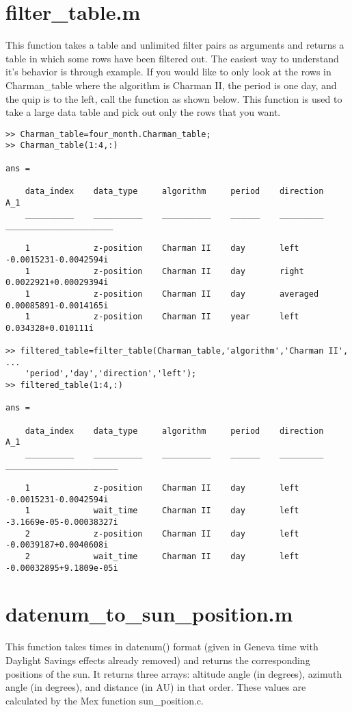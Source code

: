 \documentclass[12pt]{report}
\begin{document}
\section{filter\_table.m}
This function takes a table and unlimited filter pairs as arguments and returns a table in which some rows have been filtered out.  The easiest way to understand it's behavior is through example.  If you would like to only look at the rows in Charman\_table where the algorithm is Charman II, the period is one day, and the quip is to the left, call the function as shown below.  This function is used to take a large data table and pick out only the rows that you want.

\begin{verbatim}
>> Charman_table=four_month.Charman_table;
>> Charman_table(1:4,:)

ans = 

    data_index    data_type     algorithm     period    direction             A_1          
    __________    __________    __________    ______    _________    ______________________

    1             z-position    Charman II    day       left         -0.0015231-0.0042594i 
    1             z-position    Charman II    day       right         0.0022921+0.00029394i
    1             z-position    Charman II    day       averaged     0.00085891-0.0014165i 
    1             z-position    Charman II    year      left           0.034328+0.010111i  

>> filtered_table=filter_table(Charman_table,'algorithm','Charman II', ...
    'period','day','direction','left');
>> filtered_table(1:4,:)

ans = 

    data_index    data_type     algorithm     period    direction              A_1          
    __________    __________    __________    ______    _________    _______________________

    1             z-position    Charman II    day       left          -0.0015231-0.0042594i 
    1             wait_time     Charman II    day       left         -3.1669e-05-0.00038327i
    2             z-position    Charman II    day       left          -0.0039187+0.0040608i 
    2             wait_time     Charman II    day       left         -0.00032895+9.1809e-05i
\end{verbatim}

\section{datenum\_to\_sun\_position.m}
This function takes times in datenum() format (given in Geneva time with Daylight Savings effects already removed) and returns the corresponding positions of the sun.  It returns three arrays: altitude angle (in degrees), azimuth angle (in degrees), and distance (in AU) in that order.  These values are calculated by the Mex function sun\_position.c.  
\end{document}
